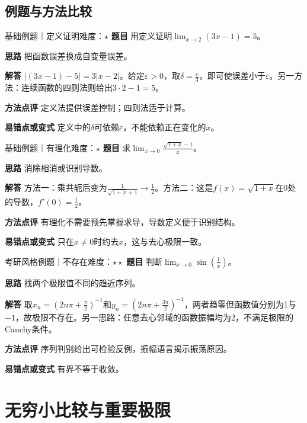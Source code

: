 \subsection{例题与方法比较}
\begin{example}{基础例题｜定义证明}{难度：$\star$}
\label{ex:1:1}\textbf{题目} 用定义证明$\lim_{x\to2}(3x-1)=5$。\par
\textbf{思路} 把函数误差换成自变量误差。\par
\textbf{解答} $|(3x-1)-5|=3|x-2|$。给定$\varepsilon>0$，取$\delta=\frac{\varepsilon}{3}$，即可使误差小于$\varepsilon$。另一方法：连续函数的四则法则给出$3\cdot2-1=5$。\par
\textbf{方法点评} 定义法提供误差控制；四则法适于计算。\par
\textbf{易错点或变式} 定义中的$\delta$可依赖$\varepsilon$，不能依赖正在变化的$x$。
\end{example}
\begin{example}{基础例题｜有理化}{难度：$\star$}
\label{ex:1:2}\textbf{题目} 求$\lim_{x\to0}\frac{\sqrt{1+x}-1}{x}$。\par
\textbf{思路} 消除相消或识别导数。\par
\textbf{解答} 方法一：乘共轭后变为$\frac{1}{\sqrt{1+x}+1}\to\frac{1}{2}$。方法二：这是$f(x)=\sqrt{1+x}$在0处的导数，$f\prime(0)=\frac{1}{2}$。\par
\textbf{方法点评} 有理化不需要预先掌握求导，导数定义便于识别结构。\par
\textbf{易错点或变式} 只在$x\ne0$时约去$x$，这与去心极限一致。
\end{example}
\begin{example}{考研风格例题｜不存在}{难度：$\star\star$}
\label{ex:1:3}\textbf{题目} 判断$\lim_{x\to0}\sin(\frac{1}{x})$。\par
\textbf{思路} 找两个极限值不同的趋近序列。\par
\textbf{解答} 取$x_n=(2n\pi+\frac{\pi}{2})^{-1}$和$y_n=(2n\pi+\frac{3\pi}{2})^{-1}$，两者趋零但函数值分别为1与$-1$，故极限不存在。另一思路：任意去心邻域的函数振幅均为2，不满足极限的Cauchy条件。\par
\textbf{方法点评} 序列判别给出可检验反例，振幅语言揭示振荡原因。\par
\textbf{易错点或变式} 有界不等于收敛。
\end{example}
\section{无穷小比较与重要极限}\label{sec:1:2}

